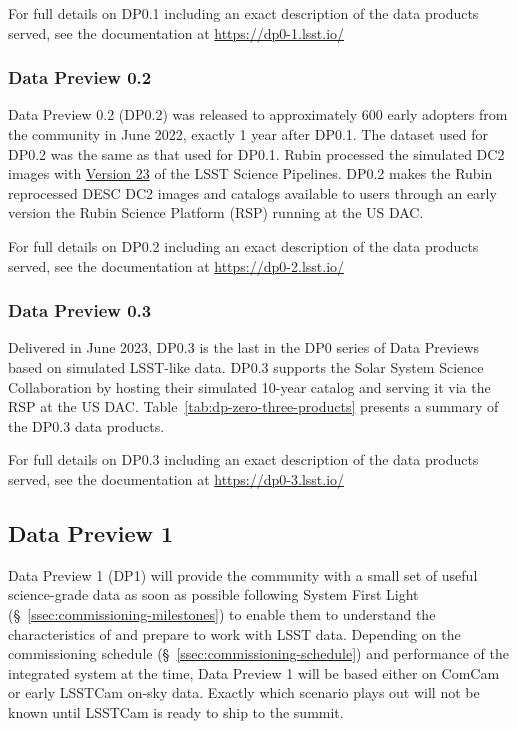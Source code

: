 For full details on DP0.1 including an exact description of the data products served, see the documentation at \url{https://dp0-1.lsst.io/}

\subsubsection{Data Preview 0.2}
\label{sec:dp02}

Data Preview 0.2 (DP0.2) was released to approximately 600 early adopters from the community in June 2022, exactly 1 year after DP0.1. 
The dataset used for DP0.2 was the same as that used for DP0.1.
Rubin processed the simulated DC2 images with \href{https://pipelines.lsst.io/v/v23_0_0/index.html}{Version 23} of the LSST Science Pipelines. 
DP0.2 makes the Rubin reprocessed DESC DC2 images and catalogs available to users through an early version the Rubin Science Platform (RSP) running at the US DAC. 

For full details on DP0.2 including an exact description of the data products served, see the documentation at \url{https://dp0-2.lsst.io/}

\subsubsection{Data Preview 0.3}
\label{sec:dp03}

Delivered in June  2023, DP0.3 is the last in the DP0 series of Data Previews based on simulated LSST-like data. 
DP0.3 supports the Solar System Science Collaboration by hosting their simulated 10-year catalog and serving it via the RSP at the US DAC. 
Table~\ref{tab:dp-zero-three-products} presents a summary of the  DP0.3 data products.

For full details on DP0.3 including an exact description of the data products served, see the documentation at \url{https://dp0-3.lsst.io/}

\subsection{Data Preview 1}
\label{sec:dp1}

Data Preview 1 (DP1) will provide the community with a small set of useful science-grade data as soon as possible following System First Light (\S~\ref{ssec:commissioning-milestones}) to enable them to understand the characteristics of and prepare to work with LSST data. 
Depending on the commissioning schedule (\S~\ref{ssec:commissioning-schedule}) and  performance of the integrated system at the time, Data Preview 1 will be based either on ComCam  or early LSSTCam on-sky data. 
Exactly which scenario plays out will not be known until LSSTCam is ready to ship to the summit. 

